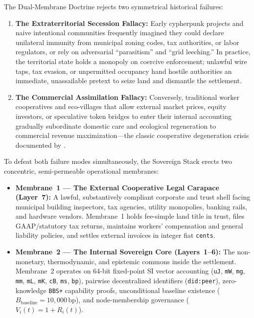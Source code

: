 The Dual-Membrane Doctrine rejects two symmetrical historical failures:
\begin{enumerate}
    \item \textbf{The Extraterritorial Secession Fallacy:} Early cypherpunk projects and naive intentional communities frequently imagined they could declare unilateral immunity from municipal zoning codes, tax authorities, or labor regulators, or rely on adversarial ``parasitism'' and ``grid leeching.'' In practice, the territorial state holds a monopoly on coercive enforcement; unlawful wire taps, tax evasion, or unpermitted occupancy hand hostile authorities an immediate, unassailable pretext to seize land and dismantle the settlement.
    \item \textbf{The Commercial Assimilation Fallacy:} Conversely, traditional worker cooperatives and eco-villages that allow external market prices, equity investors, or speculative token bridges to enter their internal accounting gradually subordinate domestic care and ecological regeneration to commercial revenue maximization---the classic cooperative degeneration crisis documented by \textcite{cornforth1995}.
\end{enumerate}

To defeat both failure modes simultaneously, the Sovereign Stack erects two concentric, semi-permeable operational membranes:
\begin{itemize}
    \item \textbf{Membrane~1 --- The External Cooperative Legal Carapace (Layer~7):} A lawful, substantively compliant corporate and trust shell facing municipal building inspectors, tax agencies, utility monopolies, banking rails, and hardware vendors. Membrane~1 holds fee-simple land title in trust, files GAAP/statutory tax returns, maintains workers' compensation and general liability policies, and settles external invoices in integer fiat \texttt{cents}.
    \item \textbf{Membrane~2 --- The Internal Sovereign Core (Layers~1--6):} The non-monetary, thermodynamic, and epistemic commons inside the settlement. Membrane~2 operates on 64-bit fixed-point SI vector accounting (\texttt{uJ}, \texttt{mW}, \texttt{mg}, \texttt{mm}, \texttt{mL}, \texttt{mK}, \texttt{cB}, \texttt{ms}, \texttt{bp}), pairwise decentralized identifiers (\texttt{did:peer}), zero-knowledge \texttt{BBS+} capability proofs, unconditional baseline existence ($B_{\mathrm{baseline}} = 10{,}000\,\mathrm{bp}$), and node-membership governance ($V_i(t) = 1 + R_i(t)$).
\end{itemize}

